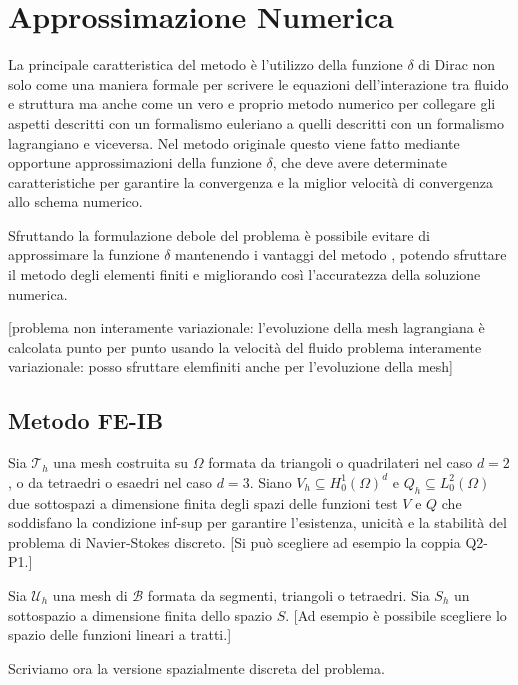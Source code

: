 
\chapter{Approssimazione Numerica}

La principale caratteristica del metodo \IB è l'utilizzo della funzione $\delta$ di Dirac non solo come una maniera formale per scrivere le equazioni dell'interazione tra fluido e struttura ma anche come un vero e proprio metodo numerico per collegare gli aspetti descritti con un formalismo euleriano a quelli descritti con un formalismo lagrangiano e viceversa. Nel metodo originale questo viene fatto mediante opportune approssimazioni della funzione $\delta$, che deve avere determinate caratteristiche per garantire la convergenza e la miglior velocità di convergenza allo schema numerico.

Sfruttando la formulazione debole del problema è possibile evitare di approssimare la funzione $\delta$ mantenendo i vantaggi del metodo \IB, potendo sfruttare il metodo degli elementi finiti e migliorando così l'accuratezza della soluzione numerica.

[problema non interamente variazionale: l'evoluzione della mesh lagrangiana è calcolata punto per punto usando la velocità del fluido
problema interamente variazionale: posso sfruttare elemfiniti anche per l'evoluzione della mesh]

\section{Metodo FE-IB}
Sia $\mathcal{T}_h$ una mesh costruita su $\Omega$ formata da triangoli o quadrilateri nel caso $d=2$, o da tetraedri o esaedri nel caso $d=3$. Siano $V_h \subseteq H^1_0(\Omega)^d$ e $Q_h \subseteq L^2_0(\Omega)$ due sottospazi a dimensione finita degli spazi delle funzioni test $V$ e $Q$ che soddisfano la condizione inf-sup per garantire l'esistenza, unicità e la stabilità del problema di Navier-Stokes discreto. [Si può scegliere ad esempio la coppia Q2-P1.]

Sia $\mathcal{U}_h$ una mesh di $\mathcal{B}$ formata da segmenti, triangoli o tetraedri. Sia $S_h$ un sottospazio a dimensione finita dello spazio $S$. [Ad esempio è possibile scegliere lo spazio delle funzioni lineari a tratti.]

Scriviamo ora la versione spazialmente discreta del problema.

